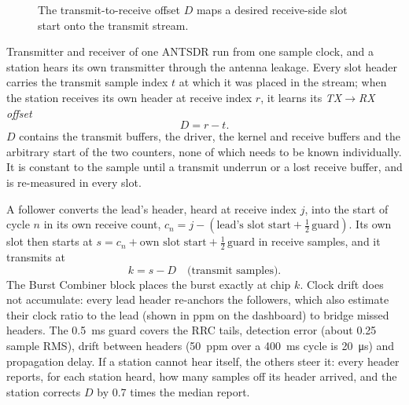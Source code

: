 \documentclass[11pt,a4paper,oneside]{report}
\begin{document}
\begin{figure}[htbp]
\centering
{}
\caption{The transmit-to-receive offset $D$ maps a desired receive-side slot start onto the transmit stream.}
\label{fig:timing}
\end{figure}

Transmitter and receiver of one ANTSDR run from one sample clock, and a station hears its own
transmitter through the antenna leakage. Every slot header carries the transmit sample index $t$ at
which it was placed in the stream; when the station receives its own header at receive index $r$, it
learns its \emph{TX$\to$RX offset}
\begin{equation}
  D=r-t .
\end{equation}
$D$ contains the transmit buffers, the driver, the kernel and receive buffers and the arbitrary start
of the two counters, none of which needs to be known individually. It is constant to the sample
until a transmit underrun or a lost receive buffer, and is re-measured in every slot.

A follower converts the lead's header, heard at receive index $j$, into the start of cycle $n$ in its
own receive count, $c_n=j-(\text{lead's slot start}+\tfrac12\,\text{guard})$. Its own slot then starts
at $s=c_n+\text{own slot start}+\tfrac12\,\text{guard}$ in receive samples, and it transmits at
\begin{equation}
  k=s-D \quad\text{(transmit samples)}.
\end{equation}
The Burst Combiner block places the burst exactly at chip $k$. Clock drift does not accumulate: every
lead header re-anchors the followers, which also estimate their clock ratio to the lead (shown in ppm
on the dashboard) to bridge missed headers. The \SI{0.5}{ms} guard covers the RRC tails, detection
error (about 0.25 sample RMS), drift between headers (\SI{50}{ppm} over a \SI{400}{ms} cycle is
\SI{20}{\micro s}) and propagation delay. If a station cannot hear itself, the others steer it: every
header reports, for each station heard, how many samples off its header arrived, and the station
corrects $D$ by 0.7 times the median report.
\end{document}
